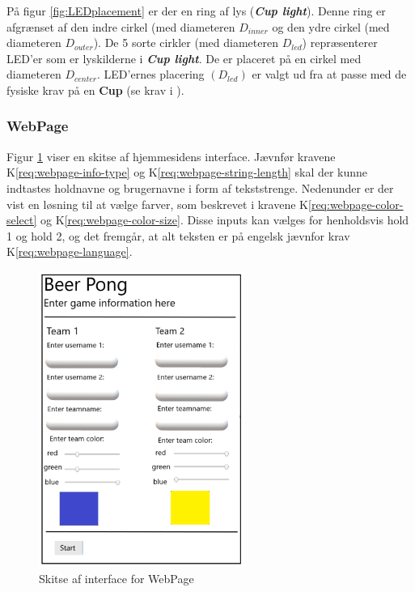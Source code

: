 \documentclass[Kravspecifikation/Kravspec_Main.tex]{subfiles}
\begin{document}
På figur \ref{fig:LEDplacement} er der en ring af lys (\textit{\textbf{Cup light}}). Denne ring er afgrænset af den indre cirkel (med diameteren $D_{inner}$ og den ydre cirkel (med diameteren $D_{outer}$). De 5 sorte cirkler (med diameteren $D_{led}$) repræsenterer LED'er som er lyskilderne i \textit{\textbf{Cup light}}. De er placeret på en cirkel med diameteren $D_{center}$. LED'ernes placering $(D_{led})$ er valgt ud fra at passe med de fysiske krav på en \textbf{Cup} (se krav i ).

\subsubsection{WebPage}
Figur \ref{fig:WebPage_IF} viser en skitse af hjemmesidens interface. Jævnfør kravene  K\ref{req:webpage-info-type} og K\ref{req:webpage-string-length} skal der kunne indtastes holdnavne og brugernavne i form af tekststrenge. Nedenunder er der vist en løsning til at vælge farver, som beskrevet i kravene K\ref{req:webpage-color-select} og K\ref{req:webpage-color-size}. Disse inputs kan vælges for henholdsvis hold 1 og hold 2, og det fremgår, at alt teksten er på engelsk jævnfor krav K\ref{req:webpage-language}.
\begin{figure}[H]
    \centering
    \includegraphics[width=0.6\textwidth]{Kravspecifikation/Ikke-funktionelle/graphics/WebPage_IF.png}
    \caption{Skitse af interface for WebPage}
   \label{fig:WebPage_IF}
\end{figure}
\end{document}
